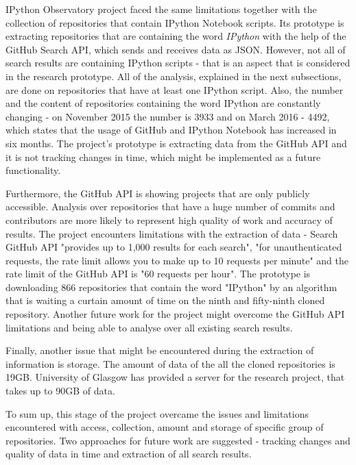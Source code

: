 IPython Observatory project faced the same limitations together with the collection of repositories that contain IPython Notebook scripts. Its prototype is extracting repositories that are containing the word \textit{IPython} with the help of the GitHub Search API\cite{GitAPISearch}, which sends and receives data as JSON\cite{json}. However, not all of search results are containing IPython scripts - that is an aspect that is considered in the research prototype. All of the analysis, explained in the next subsections, are done on repositories that have at least one IPython script. Also, the number and the content of repositories containing the word IPython are constantly changing - on November 2015 the number is 3933 and on March 2016 - 4492, which states that the usage of GitHub and IPython Notebook has increased in six months. The project's prototype is extracting data from the GitHub API and it is not tracking changes in time, which might be implemented as a future functionality.

Furthermore, the GitHub API is showing projects that are only publicly accessible. Analysis over repositories that have a huge number of commits and contributors are more likely to represent high quality of work and accuracy of results. The project encounters limitations with the extraction of data - Search GitHub API "provides up to 1,000 results for each search"\cite{GitAPISearch}, "for unauthenticated requests, the rate limit allows you to make up to 10 requests per minute"\cite{GitAPISearch} and the rate limit of the GitHub API is "60 requests per hour"\cite{GitAPI}. The prototype is downloading 866 repositories that contain the word "IPython" by an algorithm that is waiting a curtain amount of time on the ninth and fifty-ninth cloned repository. Another future work for the project might overcome the GitHub API limitations and being able to analyse over all existing search results.

Finally, another issue that might be encountered during the extraction of information is storage. The amount of data of the all the cloned repositories is 19GB. University of Glasgow has provided a server for the research project, that takes up to 90GB of data. 

To sum up, this stage of the project overcame the issues and limitations encountered with access, collection, amount and storage of specific group of repositories. Two approaches for future work are suggested - tracking changes and quality of data in time and extraction of all search results.

